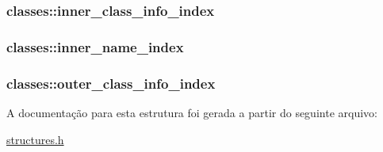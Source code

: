 \subsubsection[{\texorpdfstring{inner\+\_\+class\+\_\+info\+\_\+index}{inner_class_info_index}}]{ classes\+::inner\+\_\+class\+\_\+info\+\_\+index}\hypertarget{structclasses_a0b0500d3d12c2572e38ec03f4eb018cd}{}\label{structclasses_a0b0500d3d12c2572e38ec03f4eb018cd}
\subsubsection[{\texorpdfstring{inner\+\_\+name\+\_\+index}{inner_name_index}}]{ classes\+::inner\+\_\+name\+\_\+index}\hypertarget{structclasses_a8cdb61a61adc9fc0d99acc9be0915187}{}\label{structclasses_a8cdb61a61adc9fc0d99acc9be0915187}
\subsubsection[{\texorpdfstring{outer\+\_\+class\+\_\+info\+\_\+index}{outer_class_info_index}}]{ classes\+::outer\+\_\+class\+\_\+info\+\_\+index}\hypertarget{structclasses_a0f25ecea2b18dfbcf23e4a6975eb1f21}{}\label{structclasses_a0f25ecea2b18dfbcf23e4a6975eb1f21}


A documentação para esta estrutura foi gerada a partir do seguinte arquivo\+:\begin{DoxyCompactItemize}
\item 
\hyperlink{structures_8h}{structures.\+h}\end{DoxyCompactItemize}
